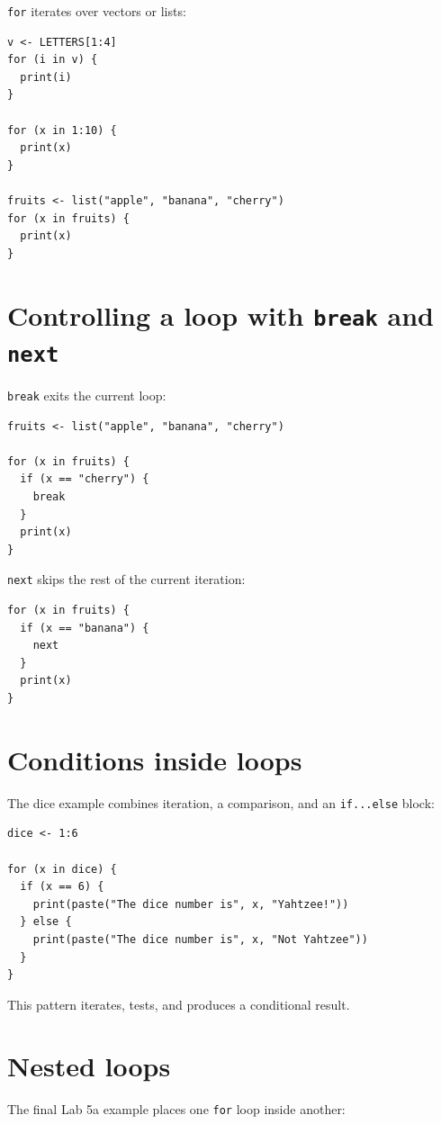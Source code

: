 \texttt{for} iterates over vectors or lists:

\begin{lstlisting}[style=dsr]
v <- LETTERS[1:4]
for (i in v) {
  print(i)
}

for (x in 1:10) {
  print(x)
}

fruits <- list("apple", "banana", "cherry")
for (x in fruits) {
  print(x)
}
\end{lstlisting}

\section{Controlling a loop with \texttt{break} and \texttt{next}}

\texttt{break} exits the current loop:

\begin{lstlisting}[style=dsr]
fruits <- list("apple", "banana", "cherry")

for (x in fruits) {
  if (x == "cherry") {
    break
  }
  print(x)
}
\end{lstlisting}

\texttt{next} skips the rest of the current iteration:

\begin{lstlisting}[style=dsr]
for (x in fruits) {
  if (x == "banana") {
    next
  }
  print(x)
}
\end{lstlisting}

\section{Conditions inside loops}

The dice example combines iteration, a comparison, and an \texttt{if...else} block:

\begin{lstlisting}[style=dsr]
dice <- 1:6

for (x in dice) {
  if (x == 6) {
    print(paste("The dice number is", x, "Yahtzee!"))
  } else {
    print(paste("The dice number is", x, "Not Yahtzee"))
  }
}
\end{lstlisting}

This pattern iterates, tests, and produces a conditional result.

\section{Nested loops}

The final Lab 5a example places one \texttt{for} loop inside another:

